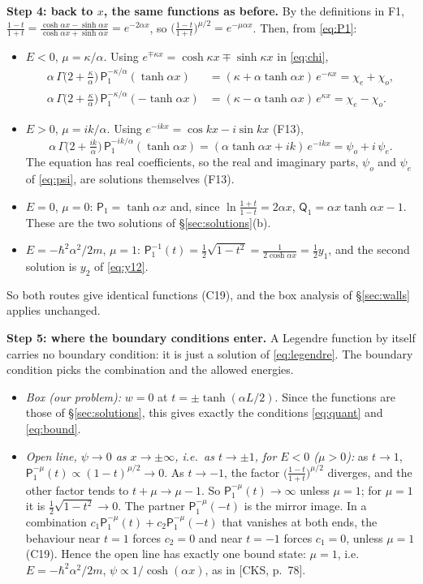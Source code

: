 \documentclass[11pt]{article}
\numberwithin{equation}{section}
\newcommand{\Eu}{\hbar^2\alpha^2/2m}
\newcommand{\tL}{\tanh(\alpha L/2)}
\newcommand{\own}[1]{\par\noindent{\footnotesize\textcolor{owncol}{\textsf{\textbf{Own step.}} #1}}\par}
\newcommand{\chk}[1]{{\footnotesize\textsf{(#1)}}}
\begin{document}
\textbf{Step 4: back to $x$, the same functions as before.} By the definitions in F1,
$\frac{1-t}{1+t}=\frac{\cosh\alpha x-\sinh\alpha x}{\cosh\alpha x+\sinh\alpha x}=e^{-2\alpha x}$, so $\big(\frac{1-t}{1+t}\big)^{\mu/2}=e^{-\mu\alpha x}$. Then, from \eqref{eq:P1}:
\begin{itemize}
\item $E<0$, $\mu=\kappa/\alpha$. Using $e^{\mp\kappa x}=\cosh\kappa x\mp\sinh\kappa x$ in \eqref{eq:chi},
\begin{align*}
\alpha\,\Gamma\big(2+\tfrac\kappa\alpha\big)\,\mathsf P_1^{-\kappa/\alpha}(\tanh\alpha x)&=(\kappa+\alpha\tanh\alpha x)\,e^{-\kappa x}=\chi_e+\chi_o,\\
\alpha\,\Gamma\big(2+\tfrac\kappa\alpha\big)\,\mathsf P_1^{-\kappa/\alpha}(-\tanh\alpha x)&=(\kappa-\alpha\tanh\alpha x)\,e^{\kappa x}=\chi_e-\chi_o .
\end{align*}
\item $E>0$, $\mu=ik/\alpha$. Using $e^{-ikx}=\cos kx-i\sin kx$ (F13),
\[
\alpha\,\Gamma\big(2+\tfrac{ik}\alpha\big)\,\mathsf P_1^{-ik/\alpha}(\tanh\alpha x)=(\alpha\tanh\alpha x+ik)\,e^{-ikx}=\psi_o+i\,\psi_e .
\]
The equation has real coefficients, so the real and imaginary parts, $\psi_o$ and $\psi_e$ of \eqref{eq:psi}, are solutions themselves (F13).
\item $E=0$, $\mu=0$: $\mathsf P_1=\tanh\alpha x$ and, since $\ln\frac{1+t}{1-t}=2\alpha x$, $\mathsf Q_1=\alpha x\tanh\alpha x-1$. These are the two solutions of \S\ref{sec:solutions}(b).
\item $E=-\Eu$, $\mu=1$: $\mathsf P_1^{-1}(t)=\frac12\sqrt{1-t^2}=\frac{1}{2\cosh\alpha x}=\frac12y_1$, and the second solution is $y_2$ of \eqref{eq:y12}.
\end{itemize}
So both routes give identical functions \chk{C19}, and the box analysis of \S\ref{sec:walls} applies unchanged.
\own{Step 4.}

\textbf{Step 5: where the boundary conditions enter.} A Legendre function by itself carries no boundary condition: it is just a solution of \eqref{eq:legendre}. The boundary condition picks the combination and the allowed energies.
\begin{itemize}
\item \emph{Box (our problem):} $w=0$ at $t=\pm\tL$. Since the functions are those of \S\ref{sec:solutions}, this gives exactly the conditions \eqref{eq:quant} and \eqref{eq:bound}.
\item \emph{Open line, $\psi\to0$ as $x\to\pm\infty$, i.e.\ as $t\to\pm1$, for $E<0$ ($\mu>0$):} as $t\to1$, $\mathsf P_1^{-\mu}(t)\propto(1-t)^{\mu/2}\to0$. As $t\to-1$, the factor $\big(\frac{1-t}{1+t}\big)^{\mu/2}$ diverges, and the other factor tends to $t+\mu\to\mu-1$. So $\mathsf P_1^{-\mu}(t)\to\infty$ unless $\mu=1$; for $\mu=1$ it is $\frac12\sqrt{1-t^2}\to0$. The partner $\mathsf P_1^{-\mu}(-t)$ is the mirror image. In a combination $c_1\mathsf P_1^{-\mu}(t)+c_2\mathsf P_1^{-\mu}(-t)$ that vanishes at both ends, the behaviour near $t=1$ forces $c_2=0$ and near $t=-1$ forces $c_1=0$, unless $\mu=1$ \chk{C19}. Hence the open line has exactly one bound state: $\mu=1$, i.e.\ $E=-\Eu$, $\psi\propto1/\cosh(\alpha x)$, as in [CKS, p.~78].
\end{itemize}
\own{Step 5.}
\end{document}
